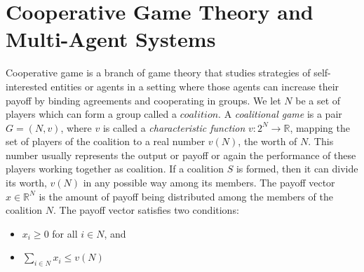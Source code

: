 

\section{Cooperative Game Theory and Multi-Agent Systems}\label{sec:CGTMS}


Cooperative game is a branch of game theory that studies
strategies of self-interested entities or agents in a setting
where those agents can increase their payoff by binding agreements
and cooperating in groups. We let $N$ be a set of players which
can form a group called a $coalition$. A \emph{coalitional game}
is a pair $G = (N, v)$, where $v$ is called a \emph{characteristic
function} $v: 2^N \to \mathbb{R}$, mapping the set of players of
the coalition to a real number $v(N)$, the worth of $N$. This
number usually represents the output or payoff or again the
performance of these players working together as coalition. If a
coalition $S$ is formed, then it can divide its worth, $v(N)$ in
any possible way among its members. The payoff vector $x \in
\mathbb{R}^N$ is the amount of payoff being distributed among the
members of the coalition $N$. The payoff vector satisfies two
conditions:

        \begin{itemize}
            \item $x_i \geq 0$ for all $i \in N$, and
            \item $\sum_{i \in N} x_i \leq v(N)$
        \end{itemize}

